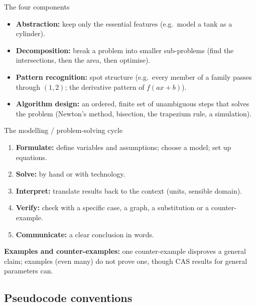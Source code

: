 \begin{cols}
\begin{defn}{The four components}
\begin{itemize}
  \item \textbf{Abstraction:} keep only the essential features (e.g.\ model a tank as a cylinder).
  \item \textbf{Decomposition:} break a problem into smaller sub-problems (find the intersections, then the area, then optimise).
  \item \textbf{Pattern recognition:} spot structure (e.g.\ every member of a family passes through $(1,2)$; the derivative pattern of $f(ax+b)$).
  \item \textbf{Algorithm design:} an ordered, finite set of unambiguous steps that solves the problem (Newton's method, bisection, the trapezium rule, a simulation).
\end{itemize}
\end{defn}
\nextcol
\begin{keyres}{The modelling / problem-solving cycle}
\begin{enumerate}
  \item \textbf{Formulate:} define variables and assumptions; choose a model; set up equations.
  \item \textbf{Solve:} by hand or with technology.
  \item \textbf{Interpret:} translate results back to the context (units, sensible domain).
  \item \textbf{Verify:} check with a specific case, a graph, a substitution or a counter-example.
  \item \textbf{Communicate:} a clear conclusion in words.
\end{enumerate}
\textbf{Examples and counter-examples:} one counter-example disproves a general claim; examples (even many) do not prove one, though CAS results for general parameters can.
\end{keyres}
\end{cols}

\subsection{Pseudocode conventions \newsd}
\label{sec:pseudo}

